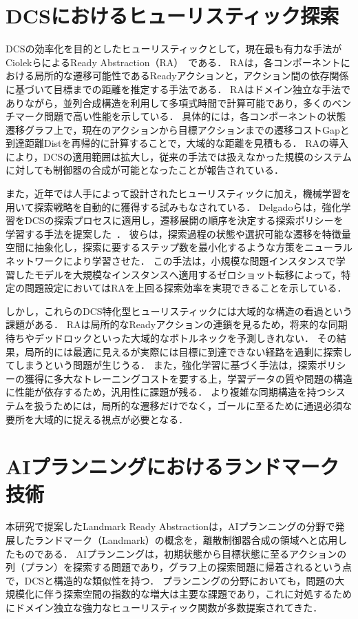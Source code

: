 \documentclass[a4paper,11pt,oneside,openany,report,dvipdfmx]{jsbook}
\begin{document}
\section{DCSにおけるヒューリスティック探索}

DCSの効率化を目的としたヒューリスティックとして，現在最も有力な手法がCiolekらによるReady Abstraction（RA）~\cite{ReadyAbstraction}である．
RAは，各コンポーネントにおける局所的な遷移可能性であるReadyアクションと，アクション間の依存関係に基づいて目標までの距離を推定する手法である．
RAはドメイン独立な手法でありながら，並列合成構造を利用して多項式時間で計算可能であり，多くのベンチマーク問題で高い性能を示している．
具体的には，各コンポーネントの状態遷移グラフ上で，現在のアクションから目標アクションまでの遷移コストGapと到達距離Distを再帰的に計算することで，大域的な距離を見積もる．
RAの導入により，DCSの適用範囲は拡大し，従来の手法では扱えなかった規模のシステムに対しても制御器の合成が可能となったことが報告されている．

また，近年では人手によって設計されたヒューリスティックに加え，機械学習を用いて探索戦略を自動的に獲得する試みもなされている．
Delgadoらは，強化学習をDCSの探索プロセスに適用し，遷移展開の順序を決定する探索ポリシーを学習する手法を提案した~\cite{ReinforcementOnTheFly}．
彼らは，探索過程の状態や選択可能な遷移を特徴量空間に抽象化し，探索に要するステップ数を最小化するような方策をニューラルネットワークにより学習させた．
この手法は，小規模な問題インスタンスで学習したモデルを大規模なインスタンスへ適用するゼロショット転移によって，特定の問題設定においてはRAを上回る探索効率を実現できることを示している．

しかし，これらのDCS特化型ヒューリスティックには大域的な構造の看過という課題がある．
RAは局所的なReadyアクションの連鎖を見るため，将来的な同期待ちやデッドロックといった大域的なボトルネックを予測しきれない．
その結果，局所的には最適に見えるが実際には目標に到達できない経路を過剰に探索してしまうという問題が生じうる．
また，強化学習に基づく手法は，探索ポリシーの獲得に多大なトレーニングコストを要する上，学習データの質や問題の構造に性能が依存するため，汎用性に課題が残る．
より複雑な同期構造を持つシステムを扱うためには，局所的な遷移だけでなく，ゴールに至るために通過必須な要所を大域的に捉える視点が必要となる．

\section{AIプランニングにおけるランドマーク技術}

本研究で提案したLandmark Ready Abstractionは，AIプランニングの分野で発展したランドマーク（Landmark）の概念を，離散制御器合成の領域へと応用したものである．
AIプランニングは，初期状態から目標状態に至るアクションの列（プラン）を探索する問題であり，グラフ上の探索問題に帰着されるという点で，DCSと構造的な類似性を持つ．
プランニングの分野においても，問題の大規模化に伴う探索空間の指数的な増大は主要な課題であり，これに対処するためにドメイン独立な強力なヒューリスティック関数が多数提案されてきた．
\end{document}
